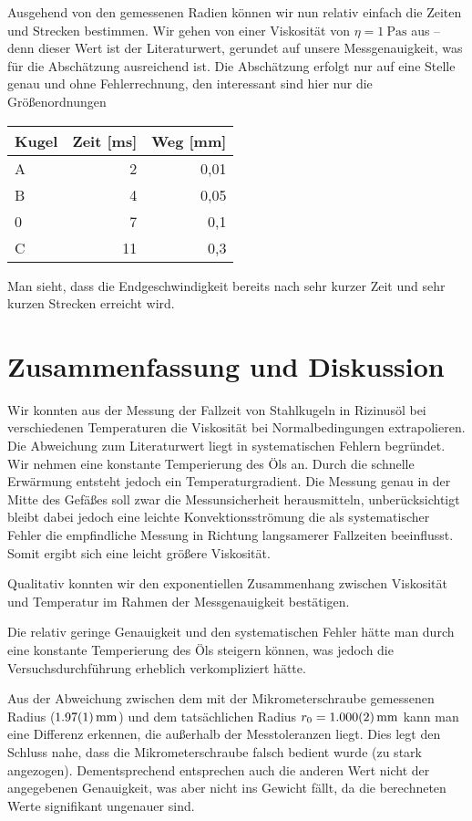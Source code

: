 \documentclass[a4paper,german,12pt,smallheadings]{scrartcl}
\begin{document}
Ausgehend von den gemessenen Radien können wir nun relativ einfach die Zeiten
und Strecken bestimmen. Wir gehen von einer Viskosität von $\eta =
\SI{1}{\pascal \second}$ aus -- denn dieser Wert ist der Literaturwert,
gerundet auf unsere Messgenauigkeit, was für die Abschätzung ausreichend ist.
Die Abschätzung erfolgt nur auf eine Stelle genau und ohne Fehlerrechnung, den
interessant sind hier nur die Größenordnungen

\vspace{0.5 cm}
\begin{tabular}{l|r|r}
  Kugel & Zeit [ms] & Weg [mm] \\
  \hline
  A & 2 & 0{,}01 \\
  B & 4 & 0{,}05 \\
  0 & 7 & 0{,}1 \\
  C & 11 & 0{,}3
\end{tabular}
\vspace{0.5 cm}

Man sieht, dass die Endgeschwindigkeit bereits nach sehr kurzer Zeit und sehr
kurzen Strecken erreicht wird.

\section*{Zusammenfassung und Diskussion}

Wir konnten aus der Messung der Fallzeit von Stahlkugeln in Rizinusöl bei
verschiedenen Temperaturen die Viskosität bei Normalbedingungen extrapolieren.
Die Abweichung zum Literaturwert liegt in systematischen Fehlern begründet. Wir
nehmen eine konstante Temperierung des Öls an. Durch die schnelle Erwärmung
entsteht jedoch ein Temperaturgradient. Die Messung genau in der Mitte des
Gefäßes soll zwar die Messunsicherheit herausmitteln, unberücksichtigt bleibt
dabei jedoch eine leichte Konvektionsströmung die als systematischer Fehler die
empfindliche Messung in Richtung langsamerer Fallzeiten beeinflusst. Somit
ergibt sich eine leicht größere Viskosität.

Qualitativ konnten wir den exponentiellen Zusammenhang zwischen Viskosität und
Temperatur im Rahmen der Messgenauigkeit bestätigen.

Die relativ geringe Genauigkeit und den systematischen Fehler hätte man durch
eine konstante Temperierung des Öls steigern können, was jedoch die
Versuchsdurchführung erheblich verkompliziert hätte.

Aus der Abweichung zwischen dem mit der Mikrometerschraube gemessenen Radius
($\SI{1.97+-0.01}{mm}$) und dem tatsächlichen Radius $r_0 =
\SI{1.000+-0.002}{mm}$ kann man eine Differenz erkennen, die außerhalb der
Messtoleranzen liegt. Dies legt den Schluss nahe, dass die Mikrometerschraube
falsch bedient wurde (zu stark angezogen).  Dementsprechend entsprechen auch
die anderen Wert nicht der angegebenen Genauigkeit, was aber nicht ins Gewicht
fällt, da die berechneten Werte signifikant ungenauer sind.
\end{document}
